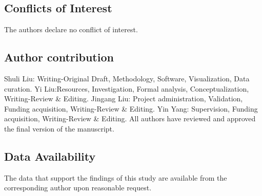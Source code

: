 \documentclass[pdflatex,sn-mathphys-num]{sn-jnl}%
\theoremstyle{thmstyleone}%
\theoremstyle{thmstyletwo}%
\theoremstyle{thmstylethree}%
\begin{document}
\subsection*{Conflicts of Interest}
The authors declare no conflict of interest.

\subsection*{Author contribution}
Shuli Liu: Writing-Original Draft, Methodology, Software, Visualization, Data curation. Yi Liu:Resources, Investigation, Formal analysis, Conceptualization, Writing-Review \& Editing. 
Jingang Liu: Project administration, Validation, Funding acquisition, Writing-Review \& Editing. 
Yin Yang: Supervision, Funding acquisition, Writing-Review \& Editing. 
All authors have reviewed and approved the final version of the manuscript.
\subsection*{Data Availability}
The data that support the findings of this study are available from the corresponding author upon reasonable request.
\end{document}
